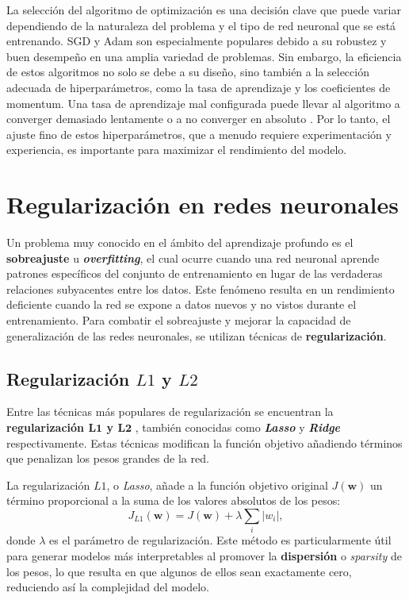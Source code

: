 La selección del algoritmo de optimización es una decisión clave que puede
variar dependiendo de la naturaleza del problema y el tipo de red neuronal que
se está entrenando. SGD y Adam son especialmente populares debido a su robustez y
buen desempeño en una amplia variedad de problemas. Sin embargo, la eficiencia de
estos algoritmos no solo se debe a su diseño, sino también a la selección
adecuada de hiperparámetros, como la tasa de aprendizaje y los coeficientes de momentum.
Una tasa de aprendizaje mal configurada puede llevar al algoritmo a converger
demasiado lentamente o a no converger en absoluto \cite{bottou2018optimization}.
Por lo tanto, el ajuste fino de estos hiperparámetros, que a menudo requiere experimentación
y experiencia, es importante para maximizar el rendimiento del modelo.

\section{Regularización en redes neuronales}

Un problema muy conocido en el ámbito del aprendizaje profundo es el \textbf{sobreajuste}
u \textbf{\textit{overfitting}}, el cual ocurre cuando una red neuronal aprende
patrones específicos del conjunto de entrenamiento en lugar de las verdaderas
relaciones subyacentes entre los datos. Este fenómeno resulta en un rendimiento deficiente
cuando la red se expone a datos nuevos y no vistos durante el entrenamiento.
Para combatir el sobreajuste y mejorar la capacidad de generalización de las
redes neuronales, se utilizan técnicas de \textbf{regularización}.

\subsection{Regularización $L1$ y $L2$}

Entre las técnicas más populares de regularización se encuentran la \textbf{regularización
	$\mathbf{L1}$ y $\mathbf{L2}$} \cite{ng2004feature}, también conocidas como \textbf{\textit{Lasso}}
y \textbf{\textit{Ridge}} respectivamente. Estas técnicas modifican la función
objetivo añadiendo términos que penalizan los pesos grandes de la red.

La regularización $L1$, o \textit{Lasso}, añade a la función objetivo original $J
(\mathbf{w})$ un término proporcional a la suma de los valores absolutos de los pesos:
\[
J_{L1}(\mathbf{w}) = J(\mathbf{w}) + \lambda \sum_{i}|w_{i}|,
\]
donde $\lambda$ es el parámetro de regularización. Este método es particularmente
útil para generar modelos más interpretables al promover la \textbf{dispersión}
o \textit{sparsity} de los pesos, lo que resulta en que algunos de ellos sean
exactamente cero, reduciendo así la complejidad del modelo.

